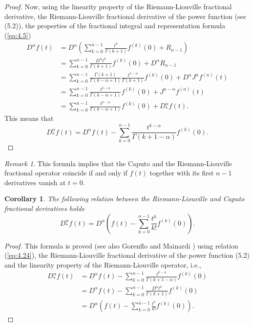 \documentclass[a4paper,14pt,oneside]{book}
\theoremstyle{plain}
\newtheorem{cor}{Corollary}[thm]
\theoremstyle{definition}
\theoremstyle{remark}
\newtheorem{rmk}{Remark}[section]
\begin{document}
\begin{center}
\begin{flushleft}
{\begin{proof}
Now, using the linearity property of the Riemann-Liouville fractional derivative, the Riemann-Liouville fractional derivative of the power function (see (5.2)), the properties of the fractional integral and representation formula (\ref{eq:4.5})
$$
\begin{aligned}
D^{\alpha} f(t) &=D^{\alpha}\left(\sum_{k=0}^{n-1} \frac{t^{k}}{\Gamma(k+1)} f^{(k)}(0)+R_{n-1}\right) \\
&=\sum_{k=0}^{n-1} \frac{D^{\alpha} t^{k}}{\Gamma(k+1)} f^{(k)}(0)+D^{\alpha} R_{n-1} \\
&=\sum_{k=0}^{n-1} \frac{\Gamma(k+1)}{\Gamma(k-\alpha+1)} \frac{t^{k-\alpha}}{\Gamma(k+1)} f^{(k)}(0)+D^{\alpha} J^{n} f^{(n)}(t) \\
&=\sum_{k=0}^{n-1} \frac{t^{k-\alpha}}{\Gamma(k-\alpha+1)} f^{(k)}(0)+J^{n-\alpha} f^{(n)}(t) \\
&=\sum_{k=0}^{n-1} \frac{t^{k-\alpha}}{\Gamma(k-\alpha+1)} f^{(k)}(0)+D_{*}^{\alpha} f(t) .
\end{aligned}
$$
This means that
$$
D_{*}^{\alpha} f(t)=D^{\alpha} f(t)-\sum_{k=0}^{n-1} \frac{t^{k-\alpha}}{\Gamma(k+1-\alpha)} f^{(k)}(0) .
$$
\end{proof}
\begin{rmk}This formula implies that the Caputo and the Riemann-Liouville fractional operator coincide if and only if $f(t)$ together with its first $n-1$ derivatives vanish at $t=0$.
\end{rmk}
\begin{cor}
The following relation between the Riemann-Liouville and Caputo fractional derivatives holds
$$
D_{*}^{\alpha} f(t)=D^{\alpha}\left(f(t)-\sum_{k=0}^{n-1} \frac{t^{k}}{k !} f^{(k)}(0)\right) .
$$
\end{cor}
\begin{proof}
This formula is proved (see also Gorenflo and Mainardi \cite{bb18}) using relation (\ref{eq:4.24}), the Riemann-Liouville fractional derivative of the power function (5.2) and the linearity property of the Riemann-Liouville operator, i.e.,
$$
\begin{aligned}
D_{*}^{\alpha} f(t) &=D^{\alpha} f(t)-\sum_{k=0}^{n-1} \frac{t^{k-\alpha}}{\Gamma(k+1-\alpha)} f^{(k)}(0) \\
&=D^{\alpha} f(t)-\sum_{k=0}^{n-1} \frac{D^{\alpha} t^{k}}{\Gamma(k+1)} f^{(k)}(0) \\
&=D^{\alpha}\left(f(t)-\sum_{k=0}^{n-1} \frac{t^{k}}{k !} f^{(k)}(0)\right) .
\end{aligned}
$$
\end{proof}

}
\end{flushleft}
\end{center}
\end{document}
